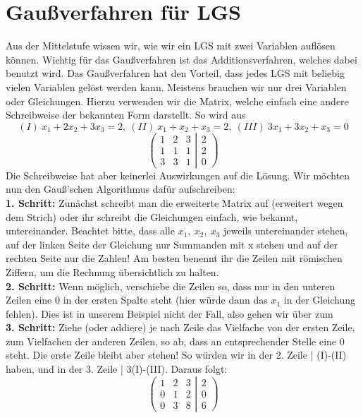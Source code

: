 \newpage
\section{Gaußverfahren für LGS}
	Aus der Mittelstufe wissen wir, wie wir ein LGS mit zwei Variablen auflösen
	können. Wichtig für das Gaußverfahren ist das Additionsverfahren, welches dabei
	benutzt wird. Das Gaußverfahren hat den Vorteil, dass jedes LGS mit beliebig
	vielen Variablen gelöst werden kann. Meistens brauchen wir nur drei Variablen
	oder Gleichungen. Hierzu verwenden wir die Matrix, welche einfach eine andere
	Schreibweise der bekannten Form darstellt. So wird aus 
	\[(I)\ x_1+2x_2+3x_3=2,\
	(II)\ x_1+x_2+x_3=2,\ (III)\ 3x_1+3x_2+x_3=0\]
	\[
	\left(
	 \begin{matrix}
	  1 & 2 & 3\\
	  1 & 1 & 1\\
	  3 & 3 & 1
	 \end{matrix}
	 \left|
	  \begin{matrix}
	   2\\
	   2\\
	   0
	  \end{matrix}
	 \right)
	\right.
	\]
	Die Schreibweise hat aber keinerlei Auswirkungen auf die Lösung. Wir möchten
	nun den Gauß'schen Algorithmus dafür aufschreiben:\\

	\textbf{1. Schritt:} Zunächst schreibt man die erweiterte Matrix auf (erweitert
	wegen dem Strich) oder ihr schreibt die Gleichungen einfach, wie bekannt,
	untereinander. Beachtet bitte, dass alle \(x_1,\ x_2,\ x_3\) jeweils
	untereinander stehen, auf der linken Seite der Gleichung nur Summanden mit x
	stehen und auf der rechten Seite nur die Zahlen! Am besten benennt ihr die
	Zeilen mit römischen Ziffern, um die Rechnung übersichtlich zu halten.\\

	\textbf{2. Schritt:} Wenn möglich, verschiebe die Zeilen so, dass nur in den
	unteren Zeilen eine 0 in der ersten Spalte steht (hier würde dann das \(x_1\)
	in der Gleichung fehlen). Dies ist in unserem Beispiel nicht der Fall, also
	gehen wir über zum\\

	\textbf{3. Schritt:} Ziehe (oder addiere) je nach Zeile das Vielfache von der
	ersten Zeile, zum Vielfachen der anderen Zeilen, so ab, dass an entsprechender
	Stelle eine 0 steht. Die erste Zeile bleibt aber stehen! So würden wir in der
	2. Zeile | (I)-(II) haben, und in der 3. Zeile | 3(I)-(III). Daraus folgt:
	\[
	\left(
	 \begin{matrix}
	  1 & 2 & 3\\
	  0 & 1 & 2\\
	  0 & 3 & 8
	 \end{matrix}
	 \left|
	  \begin{matrix}
	   2\\
	   0\\
	   6
	  \end{matrix}
	 \right)
	\right.
	\]

